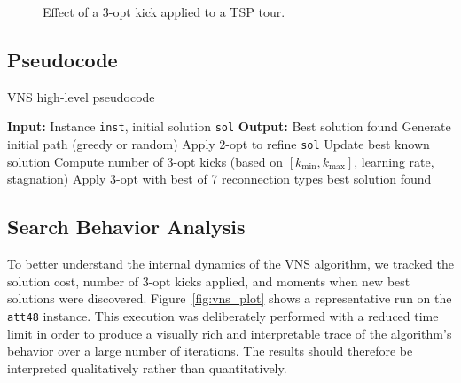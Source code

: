 \begin{figure}[H]
\begin{subfigure}[c]{.4\textwidth}
{
        }
    \end{subfigure}
    \caption{Effect of a 3-opt kick applied to a TSP tour.}
    \label{fig:3optkick}
\end{figure}

\subsection{Pseudocode}

\begin{algorithm}[H]
\caption{VNS high-level pseudocode}
\label{alg:vns_highlevel}
\begin{algorithmic}
\State \textbf{Input:} Instance \texttt{inst}, initial solution \texttt{sol}
\State \textbf{Output:} Best solution found
\State
{}
    \State Generate initial path (greedy or random)
\EndIf
{}
    \State Apply 2-opt to refine \texttt{sol}
        \State Update best known solution
    \Else
        \State Compute number of 3-opt kicks (based on $[k_{\min}, k_{\max}]$, learning rate, stagnation)
            \State Apply 3-opt with best of 7 reconnection types
        \EndFor
    \EndIf
\EndWhile
\State \Return best solution found
\end{algorithmic}
\end{algorithm}


\subsection{Search Behavior Analysis}

To better understand the internal dynamics of the VNS algorithm, we tracked the solution cost, number of 3-opt kicks applied, and moments when new best solutions were discovered. Figure~\ref{fig:vns_plot} shows a representative run on the \texttt{att48} instance. This execution was deliberately performed with a reduced time limit in order to produce a visually rich and interpretable trace of the algorithm's behavior over a large number of iterations. The results should therefore be interpreted qualitatively rather than quantitatively.

